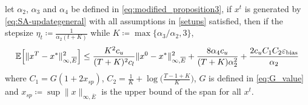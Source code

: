 \begin{theorem} \label{thm:formalbiasedSA}
    let $\alpha_2$,  $\alpha_3$ and  $\alpha_4$ be defined in \eqref{eq:modified_proposition3}, if $x^t$ is generated by \eqref{eq:SA-updategeneral} with all assumptions in \ref{setups} satisfied, then if the stepsize $\eta_t \coloneqq \frac{1}{\alpha_2(t+K)}$ while $K \coloneqq \max\{ \alpha_3/\alpha_2, 3\}$,
    \begin{equation} \label{eq:biasedSAformal}
        \mathbb{E}\Bigl[\|x^T - x^*\|^2_{\infty,\overline{E}}\Bigr] \leq \frac{K^2 c_u}{(T+K)^2c_l} \|x^0 - x^*\|^2_{\infty,\overline{E}} + \frac{8 \alpha_4 c_u}{(T+K)\alpha_2^2} + \frac{2c_u C_1 C_2 \varepsilon_{\text{bias}} }{\alpha_2} 
    \end{equation}
    where $C_1 = G(1+2x_{sp})$, $C_2 = \frac{1}{K} + \log \big(\frac{T-1+K}{K}\big)$, $G$ is defined in \eqref{eq:G_value} and $x_{sp} \coloneqq \sup \|x\|_{\infty,\overline{E}}$ is the upper bound of the span for all $x^t$.
\end{theorem}

